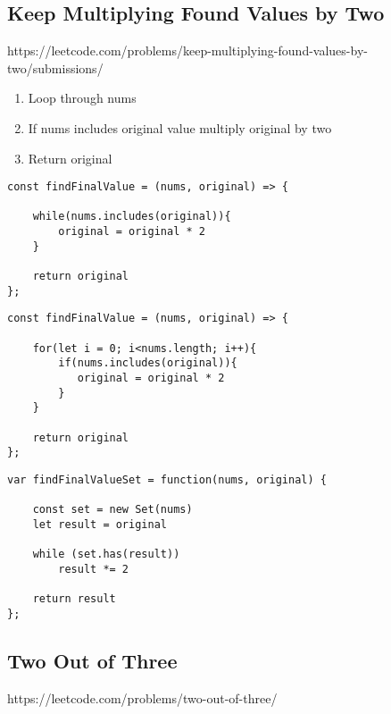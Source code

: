\documentclass[10pt]{article}
\begin{document}
\pagebreak %
\medskip   
\subsection{Keep Multiplying Found Values by Two}
https://leetcode.com/problems/keep-multiplying-found-values-by-two/submissions/

\begin{enumerate}
	\item Loop through nums
	\item If nums includes original value multiply original by two 
	\item Return original
\end{enumerate}

\begin{lstlisting}[title=Solution findFinalValue with while loop, captionpos=t]
const findFinalValue = (nums, original) => {

    while(nums.includes(original)){
        original = original * 2
    }

    return original
};
\end{lstlisting}


\begin{lstlisting}[title=Solution findFinalValue with for loop, captionpos=t]
const findFinalValue = (nums, original) => {
        
    for(let i = 0; i<nums.length; i++){
        if(nums.includes(original)){
           original = original * 2
        }
    }
    
    return original
};
\end{lstlisting}

\begin{lstlisting}[title=Solution findFinalValue with set, captionpos=t]
var findFinalValueSet = function(nums, original) {

    const set = new Set(nums)
    let result = original
    
    while (set.has(result))
        result *= 2

    return result
};
\end{lstlisting}

\medskip %







\pagebreak %
\medskip   
\subsection{Two Out of Three}
https://leetcode.com/problems/two-out-of-three/
\end{document}
